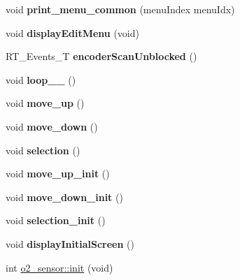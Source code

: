 \begin{DoxyCompactItemize}
void {\bfseries print\+\_\+menu\+\_\+common} (menu\+Index menu\+Idx)
\item 
\mbox{\label{group___ventilator_module_gaf9a555246d65937f5dee44a1a8f9643c}} 
void {\bfseries display\+Edit\+Menu} (void)
\item 
\mbox{\label{group___ventilator_module_gae8f8010d24bd6682808aeab463602b25}} 
R\+T\+\_\+\+Events\+\_\+T {\bfseries encoder\+Scan\+Unblocked} ()
\item 
\mbox{\label{group___ventilator_module_gab0413c18f212b50e826a3f71d0dedd6d}} 
void {\bfseries loop\+\_\+\+\_\+} ()
\item 
\mbox{\label{group___ventilator_module_ga4778768c03ef5defbb97e042699f1f0f}} 
void {\bfseries move\+\_\+up} ()
\item 
\mbox{\label{group___ventilator_module_ga78f1eaf7be204b81c03899d4c8cbad6a}} 
void {\bfseries move\+\_\+down} ()
\item 
\mbox{\label{group___ventilator_module_ga74ea28f28bd471e742862f758bd70adc}} 
void {\bfseries selection} ()
\item 
\mbox{\label{group___ventilator_module_ga9555fd38ea56c0c8d4412b3aca3c5f40}} 
void {\bfseries move\+\_\+up\+\_\+init} ()
\item 
\mbox{\label{group___ventilator_module_gafbfa17a6f9fb6936632b004277fe9dff}} 
void {\bfseries move\+\_\+down\+\_\+init} ()
\item 
\mbox{\label{group___ventilator_module_ga4d6ac601d7391fcc17a6d9b7437048dd}} 
void {\bfseries selection\+\_\+init} ()
\item 
\mbox{\label{group___ventilator_module_ga615349f9fc07fbfe4c881de7c3b2c101}} 
void {\bfseries display\+Initial\+Screen} ()
\item 
int \hyperlink{group___ventilator_module_ga913dbc20ebbe78e12f33075d8b0b4b1a}{o2\+\_\+sensor\+::init} (void)

\end{DoxyCompactItemize}
